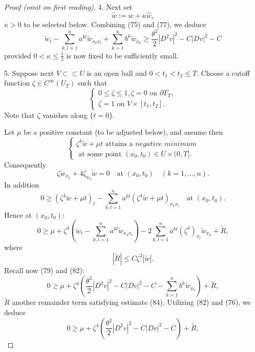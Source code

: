 \begin{proof}[Proof (omit on first reading)]
4. Next set
\[
\tilde w := w + \kappa \hat{w},
\tag{78}
\]
$\kappa > 0$ to be selected below. Combining (75) and (77), we deduce
\[
\tilde w_t - \sum_{k,l=1}^n a^{kl}\tilde w_{x_k x_l} + \sum_{k=1}^n b^k \tilde w_{x_k} \geq \frac{\theta^2}{2}|D^2v|^2 - C|Dv|^2 - C
\tag{79}
\]
provided $0 < \kappa \leq \frac{1}{2}$ is now fixed to be sufficiently small.

5. Suppose next $V \subset\subset U$ is an open ball and $0 < t_1 < t_2 \leq T$. Choose a cutoff function $\zeta \in C^\infty(U_T)$ such that
\[
\begin{cases} 0 \leq \zeta \leq 1, \zeta = 0 \text{ on } \partial \Gamma_T, \\ \zeta = 1 \text{ on } V \times [t_1, t_2]. \end{cases}
\tag{80}
\]
Note that $\zeta$ vanishes along $\{t = 0\}$.

Let $\mu$ be a positive constant (to be adjusted below), and assume then
\[
\begin{cases} \zeta^4 \tilde w + \mu t \text{ attains a } \textit{negative minimum} \\ \text{ at some point } (x_0, t_0) \in U \times (0, T]. \end{cases}
\tag{81}
\]
Consequently
\[
\zeta \tilde w_{x_k} + 4\zeta_{x_k} \tilde w = 0 \quad \text{at } (x_0, t_0) \quad (k = 1, \ldots, n).
\tag{82}
\]
In addition
\[
0 \geq (\zeta^4 \tilde w + \mu t)_t - \sum_{k,l=1}^n a^{kl}(\zeta^4 \tilde w + \mu t)_{x_k x_l} \quad \text{at } (x_0, t_0).
\]
Hence at $(x_0, t_0)$:
\[
0 \geq \mu + \zeta^4 \left( \tilde w_t - \sum_{k,l=1}^n a^{kl} \tilde w_{x_k x_l} \right) - 2 \sum_{k,l=1}^n a^{kl}(\zeta^4)_{x_l} \tilde w_{x_k} + \tilde R,
\tag{83}
\]
where
\[
|\tilde R| \leq C\zeta^2|\tilde w|.
\tag{84}
\]
Recall now (79) and (82):
\[
0 \geq \mu + \zeta^4 \left( \frac{\theta^2}{2}|D^2 v|^2 - C|Dv|^2 - C - \sum_{k=1}^n b^k \tilde w_{x_k} \right) + \tilde R,
\]
$\tilde R$ another remainder term satisfying estimate (84). Utilizing (82) and (76), we deduce
\[
0 \geq \mu + \zeta^4 \left( \frac{\theta^2}{2}|D^2 v|^2 - C|Dv|^2 - C \right) + \tilde R,
\tag{85}
\]
\end{proof}

